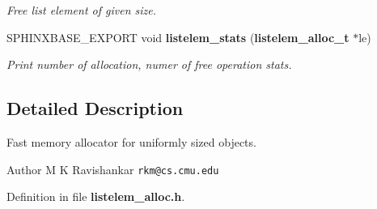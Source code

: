 \begin{DoxyCompactItemize}
\begin{DoxyCompactList}\small\item\em Free list element of given size. \end{DoxyCompactList}\item 
S\-P\-H\-I\-N\-X\-B\-A\-S\-E\-\_\-\-E\-X\-P\-O\-R\-T void {\bf listelem\-\_\-stats} ({\bf listelem\-\_\-alloc\-\_\-t} $\ast$le)\label{listelem__alloc_8h_a838d9361ba76a89a834a7ea6a185b57d}

\begin{DoxyCompactList}\small\item\em Print number of allocation, numer of free operation stats. \end{DoxyCompactList}\end{DoxyCompactItemize}


\subsection{Detailed Description}
Fast memory allocator for uniformly sized objects. \begin{DoxyAuthor}{Author}
M K Ravishankar {\tt rkm@cs.\-cmu.\-edu} 
\end{DoxyAuthor}


Definition in file {\bf listelem\-\_\-alloc.\-h}.

